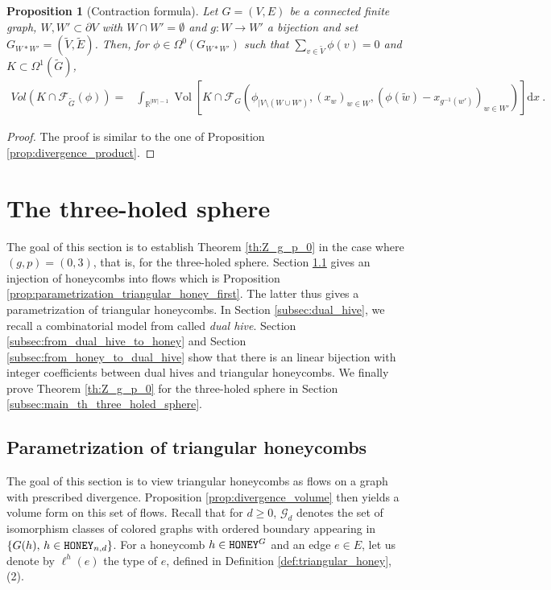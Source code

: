 \documentclass[11pt,a4paper]{amsart}
\providecommand{\diff}{\mathrm d}
\providecommand{\Vol}{\operatorname{Vol}}
\providecommand{\honey}{\texttt{\textsc{HONEY}}}
\numberwithin{equation}{section}
\newtheorem{proposition}[theorem]{Proposition}
\theoremstyle{definition}
\begin{document}
\begin{proposition}[Contraction formula]\label{prop:divergence_contraction}
Let $G=(V,E)$ be a connected finite graph, $W,W'\subset \partial V$ with $W\cap W'=\emptyset$ and $g:W\rightarrow W'$ a bijection and set $G_{W*W'}=(\tilde{V},\tilde{E})$. Then, for $\phi\in \Omega^0(G_{W*W'})$ such that $\sum_{v\in \tilde{V}}\phi(v)=0$ and $K\subset \Omega^1(\tilde{G})$,
\begin{align*}
Vol(K\cap\mathcal{F}_{\tilde{G}}(\phi))= &\int_{\mathbb{R}^{\vert W\vert-1}} 
\Vol\left[K\cap \mathcal{F}_{G}(\phi_{\vert V\setminus (W\cup W')}, 
(x_w)_{w\in W},(\phi(\tilde{w})-x_{g^{-1}(w')})_{w\in W'})\right] \diff x \ .
\end{align*}
\end{proposition}
\begin{proof}
The proof is similar to the one of Proposition \ref{prop:divergence_product}.
\end{proof}



\section{The three-holed sphere}
\label{sec:three_holed_sphere}

The goal of this section is to establish Theorem \ref{th:Z_g_p_0} 
in the case where $(g, p) = (0, 3)$, that is, for the three-holed sphere. 
Section \ref{subsec:parametrization_honeycombs} gives an 
injection of honeycombs into flows which is 
Proposition \ref{prop:parametrization_triangular_honey_first}. 
The latter thus gives a parametrization of triangular honeycombs. 
In Section \ref{subsec:dual_hive}, we recall a combinatorial model from 
\cite{françois2024positiveformulaproductconjugacy} called \textit{dual hive}. 
Section \ref{subsec:from_dual_hive_to_honey} and Section \ref{subsec:from_honey_to_dual_hive} 
show that there is an linear bijection with integer coefficients between dual hives 
and triangular honeycombs. 
We finally prove Theorem \ref{th:Z_g_p_0} 
for the three-holed sphere in Section \ref{subsec:main_th_three_holed_sphere}.


\subsection{Parametrization of triangular honeycombs}
\label{subsec:parametrization_honeycombs}

The goal of this section is to view triangular honeycombs 
as flows on a graph with prescribed divergence. 
Proposition \ref{prop:divergence_volume} then yields a volume form on this set of 
flows. Recall that for $d \geqslant 0$, $\mathcal{G}_d$ denotes 
the set of isomorphism classes of colored 
graphs with ordered boundary appearing in $\{G(h),\,h \in \honey_{n,d}\}$.
For a honeycomb $h\in \honey^G$ and an edge $e \in E$, let us denote by 
$\ell^h(e)$ the type of $e$, defined in Definition \ref{def:triangular_honey}, (2).
\end{document}
